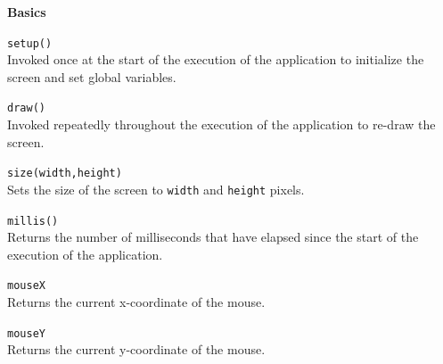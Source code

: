 \documentclass[10pt,twocolumn]{article}
\begin{document}
\thispagestyle{empty}


\noindent\textbf{\large Basics}
\begin{description}
\item{\texttt{setup()}}\ \\[.25em]
%
  Invoked once at the start of the execution of the application to
  initialize the screen and set global variables.

\item{\texttt{draw()}} \ \\[.25em]
%
  Invoked repeatedly throughout the execution of the application to
  re-draw the screen.

\item{\texttt{size(width,height)}} \ \\[.25em]
  Sets the size of the screen to \texttt{width} and \texttt{height}
  pixels.

\item{\texttt{millis()}} \ \\[.25em]
%
  Returns the number of milliseconds that have elapsed since the start
  of the execution of the application.
\item{\texttt{mouseX}} \ \\[.25em]
%
  Returns the current x-coordinate of the mouse.

\item{\texttt{mouseY}} \ \\[.25em]
%
  Returns the current y-coordinate of the mouse.
\end{description}

\bigskip
\end{document}
